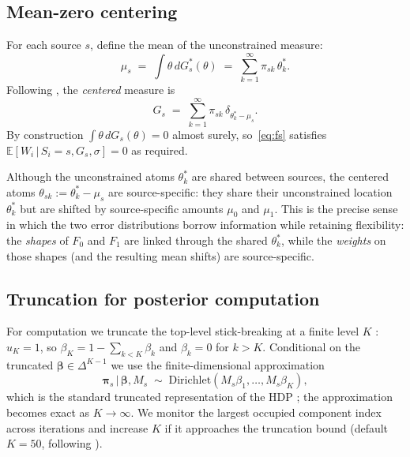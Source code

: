 \documentclass[11pt]{article}
\newcommand{\given}{\,|\,}
\newcommand{\E}{\mathbb{E}}
\newcommand{\1}{\mathbf{1}}
\begin{document}
\subsection{Mean-zero centering}\label{sec:centering}

For each source $s$, define the mean of the unconstrained measure:
\begin{equation}
\mu_s \;=\; \int \theta\, dG_s^*(\theta) \;=\; \sum_{k=1}^\infty \pi_{sk}\, \theta_k^*.
\end{equation}
Following \citet{yang2010semiparametric}, the \emph{centered} measure is
\begin{equation}
G_s \;=\; \sum_{k=1}^\infty \pi_{sk}\, \delta_{\theta_k^* - \mu_s}.
\end{equation}
By construction $\int \theta\, dG_s(\theta) = 0$ almost surely, so~\eqref{eq:fs} satisfies $\E[W_i \given S_i = s, G_s, \sigma] = 0$ as required.

Although the unconstrained atoms $\theta_k^*$ are shared between sources, the centered atoms $\theta_{sk} := \theta_k^* - \mu_s$ are source-specific: they share their unconstrained location $\theta_k^*$ but are shifted by source-specific amounts $\mu_0$ and $\mu_1$. This is the precise sense in which the two error distributions borrow information while retaining flexibility: the \emph{shapes} of $F_0$ and $F_1$ are linked through the shared $\theta_k^*$, while the \emph{weights} on those shapes (and the resulting mean shifts) are source-specific.

\subsection{Truncation for posterior computation}

For computation we truncate the top-level stick-breaking at a finite level $K$ \citep{ishwaran2001gibbs}: $u_K = 1$, so $\beta_K = 1 - \sum_{k < K} \beta_k$ and $\beta_k = 0$ for $k > K$. Conditional on the truncated $\bm{\beta} \in \Delta^{K-1}$ we use the finite-dimensional approximation
\begin{equation}
\bm{\pi}_s \given \bm{\beta}, M_s \;\sim\; \mathrm{Dirichlet}(M_s \beta_1, \ldots, M_s \beta_K),
\label{eq:pi-prior}
\end{equation}
which is the standard truncated representation of the HDP \citep{teh2006hierarchical, wang2009variational}; the approximation becomes exact as $K \to \infty$. We monitor the largest occupied component index across iterations and increase $K$ if it approaches the truncation bound (default $K = 50$, following \citet{henderson2020individualized}).
\end{document}
